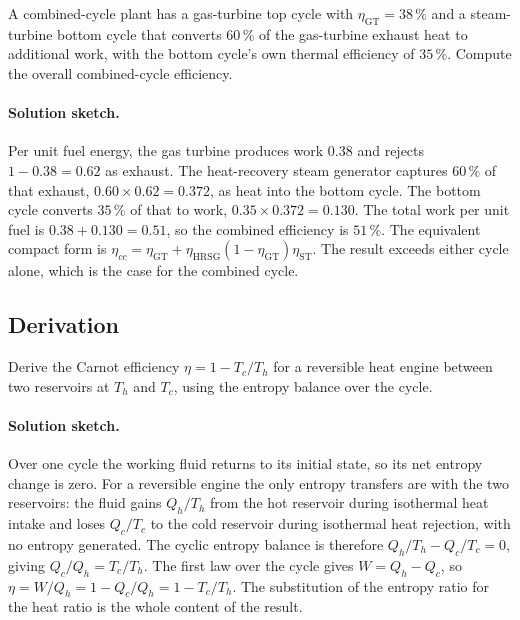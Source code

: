 \begin{exercise}
A combined-cycle plant has a gas-turbine top cycle with $\eta_{\text{GT}}
= 38\,\%$ and a steam-turbine bottom cycle that converts $60\,\%$ of
the gas-turbine exhaust heat to additional work, with the bottom
cycle's own thermal efficiency of $35\,\%$. Compute the overall
combined-cycle efficiency.

\paragraph{Solution sketch.} Per unit fuel energy, the gas turbine
produces work $0.38$ and rejects $1 - 0.38 = 0.62$ as exhaust. The
heat-recovery steam generator captures $60\,\%$ of that exhaust,
$0.60 \times 0.62 = 0.372$, as heat into the bottom cycle. The bottom
cycle converts $35\,\%$ of that to work, $0.35 \times 0.372 = 0.130$.
The total work per unit fuel is $0.38 + 0.130 = 0.51$, so the combined
efficiency is $51\,\%$. The equivalent compact form is $\eta_{cc} =
\eta_{\text{GT}} + \eta_{\text{HRSG}}(1 - \eta_{\text{GT}})
\eta_{\text{ST}}$. The result exceeds either cycle alone, which is the
case for the combined cycle.
\end{exercise}

\subsection*{Derivation}

\begin{exercise}
Derive the Carnot efficiency $\eta = 1 - T_c/T_h$ for a reversible
heat engine between two reservoirs at $T_h$ and $T_c$, using the
entropy balance over the cycle.

\paragraph{Solution sketch.} Over one cycle the working fluid returns to
its initial state, so its net entropy change is zero. For a reversible
engine the only entropy transfers are with the two reservoirs: the fluid
gains $Q_h/T_h$ from the hot reservoir during isothermal heat intake and
loses $Q_c/T_c$ to the cold reservoir during isothermal heat rejection,
with no entropy generated. The cyclic entropy balance is therefore
$Q_h/T_h - Q_c/T_c = 0$, giving $Q_c/Q_h = T_c/T_h$. The first law over
the cycle gives $W = Q_h - Q_c$, so $\eta = W/Q_h = 1 - Q_c/Q_h =
1 - T_c/T_h$. The substitution of the entropy ratio for the heat ratio
is the whole content of the result.
\end{exercise}

